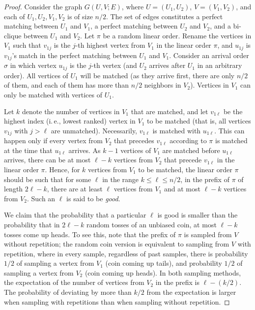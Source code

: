 \documentclass[11pt]{article}
\numberwithin{equation}{section}
\theoremstyle{definition}
\theoremstyle{plain}
\newcommand{\ie}{i.\,e.}
\theoremstyle{plain}
\begin{document}
\begin{proof}
	Consider the graph $G(U,V;E)$, where $U=(U_1,U_2)$, $V=(V_1,V_2)$, and each of $U_1,U_2,V_1,V_2$ is of size $n/2$. The set of edges constitutes a perfect matching between $U_1$ and $V_1$, a perfect matching between $U_2$ and $V_2$, and a bi-clique between $U_1$ and $V_2$.
	Let $\pi$ be a random linear order. Rename the vertices in $V_1$ such that $v_{1j}$ is the $j$-th highest vertex from $V_1$ in the linear order $\pi$, and $u_{1j}$ is $v_{1j}$'s match in the perfect matching between $U_1$ and $V_1$.
	Consider an arrival order $\sigma$ in which vertex $u_{1j}$ is the $j$-th vertex (and $U_2$ arrives after $U_1$ in an arbitrary order). All vertices of $U_1$ will be matched (as they arrive first, there are only $n/2$ of them, and each of them has more than $n/2$ neighbors in $V_2$). Vertices in $V_1$ can only be matched with vertices of $U_1$. 
	
	Let $k$ denote the number of vertices in $V_1$ that are matched, and let $v_{1\ell}$ be the highest index (\ie, lowest ranked) vertex in $V_1$ to be matched (that is, all vertices $v_{1j}$ with $j>\ell$ are unmatched). Necessarily, $v_{1\ell}$ is matched with $u_{1\ell}$. This can happen only if every vertex from $V_2$ that precedes $v_{1\ell}$ according to $\pi$ is matched at the time that $u_{1\ell}$ arrives. As $k-1$ vertices of $V_1$ are matched before $u_{1\ell}$ arrives, there can be at most $\ell - k$ vertices from $V_2$ that precede $v_{1\ell}$ in the linear order $\pi$. Hence, for $k$ vertices from $V_1$ to be matched, the linear order $\pi$ should be such that for some $\ell$ in the range $k \le \ell \le n/2$, in the prefix of $\pi$ of length $2\ell-k$, there are at least $\ell$ vertices from $V_1$ and at most $\ell - k$ vertices from $V_2$. Such an $\ell$ is said to be \emph{good}. 
	
	We claim that the probability that a particular $\ell$ is good is smaller than the probability that in $2\ell-k$ random tosses of an unbiased coin, at most $\ell-k$ tosses come up heads. To see this, note that the prefix of $\pi$ is sampled from $V$ without repetition; the random coin version is equivalent to sampling from $V$ with repetition, where in every sample, regardless of past samples, there is probability %
 $1/2$   %
of sampling a vertex from $V_1$ (coin coming up tails), and probability
%
$1/2$   %
of sampling a vertex from $V_2$ (coin coming up heads). In both sampling methods, the expectation of the number of vertices from $V_2$ in the prefix is 
%
$\ell - (k/2)$.   %
 The probability of deviating by more than 
%
$k/2$  %
from the expectation is larger when sampling with repetitions than when sampling without repetition. 
	

\end{proof}
\end{document}
